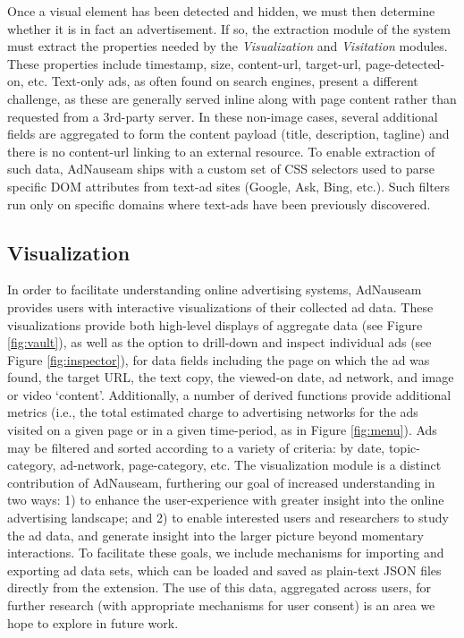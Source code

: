 \documentclass[conference]{IEEEtran}
\begin{document}
Once a visual element has been detected and hidden, we must then determine whether it is in fact an advertisement. If so, the extraction module of the system must extract the properties needed by the \emph{Visualization} and \emph{Visitation} modules. These properties include timestamp, size, content-url, target-url, page-detected-on, etc. Text-only ads, as often found on search engines, present a different challenge, as these are generally served inline along with page content rather than requested from a 3rd-party server. In these non-image cases, several additional fields are aggregated to form the content payload (title, description, tagline) and there is no content-url linking to an external resource. To enable extraction of such data, AdNauseam ships with a custom set of CSS selectors used to parse specific DOM attributes from text-ad sites (Google, Ask, Bing, etc.). Such filters run only on specific domains where text-ads have been previously discovered.


\subsection{Visualization}

In order to facilitate understanding online advertising systems, AdNauseam provides users with interactive visualizations of their collected ad data. These visualizations provide both high-level displays of aggregate data (see Figure \ref{fig:vault}), as well as the option to drill-down and inspect individual ads (see Figure \ref{fig:inspector}), for data fields including the page on which the ad was found, the target URL, the text copy, the viewed-on date, ad network, and image or video ‘content’. Additionally, a number of derived functions provide additional metrics (i.e., the total estimated charge to advertising networks for the ads visited on a given page or in a given time-period, as in Figure \ref{fig:menu}). Ads may be filtered and sorted according to a variety of criteria: by date, topic-category, ad-network, page-category, etc. The visualization module is a distinct contribution of AdNauseam, furthering our goal of increased understanding in two ways: 1) to enhance the user-experience with greater insight into the online advertising landscape; and 2) to enable interested users and researchers to study the ad data, and generate insight into the larger picture beyond momentary interactions. To facilitate these goals, we include mechanisms for importing and exporting ad data sets, which can be loaded and saved as plain-text JSON files directly from the extension. The use of this data, aggregated across users, for further research (with appropriate mechanisms for user consent) is an area we hope to explore in future work.
\end{document}
